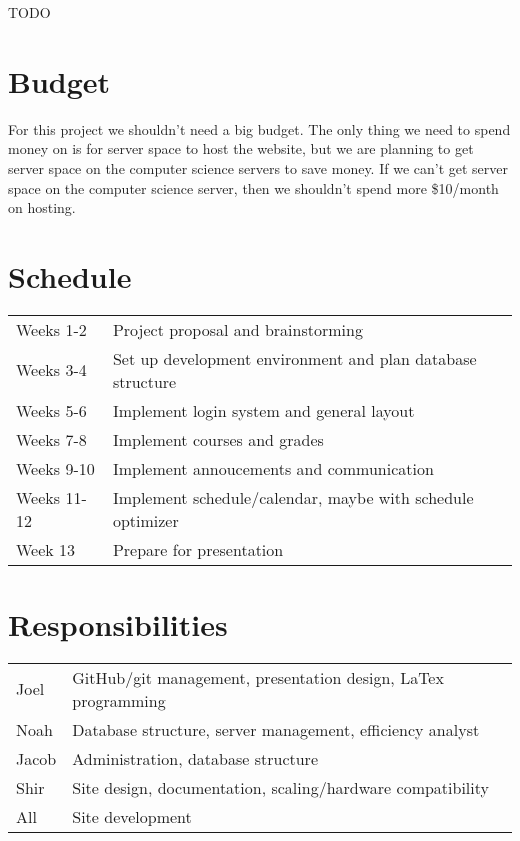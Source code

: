 \documentclass{article}
\begin{document}
TODO

\section{Budget}

For this project we shouldn’t need a big budget. The only thing we need to
spend money on is for server space to host the website, but we are planning to
get server space on the computer science servers to save money. If we can’t get
server space on the computer science server, then we shouldn’t spend more
\$10/month on hosting.

\section{Schedule}

\begin{tabular}{ll}
    Weeks 1-2&Project proposal and brainstorming\\
    Weeks 3-4&Set up development environment and plan database structure\\
    Weeks 5-6&Implement login system and general layout\\
    Weeks 7-8&Implement courses and grades\\
    Weeks 9-10&Implement annoucements and communication\\
    Weeks 11-12&Implement schedule/calendar, maybe with schedule optimizer\\
    Week 13&Prepare for presentation\\
\end{tabular}

\section{Responsibilities}

\begin{tabular}{ll}
    Joel&GitHub/git management, presentation design, LaTex programming\\
    Noah&Database structure, server management, efficiency analyst\\
    Jacob&Administration, database structure\\
    Shir&Site design, documentation, scaling/hardware compatibility\\
    All&Site development\\
\end{tabular}

\nocite{*}

{}

\end{document}

